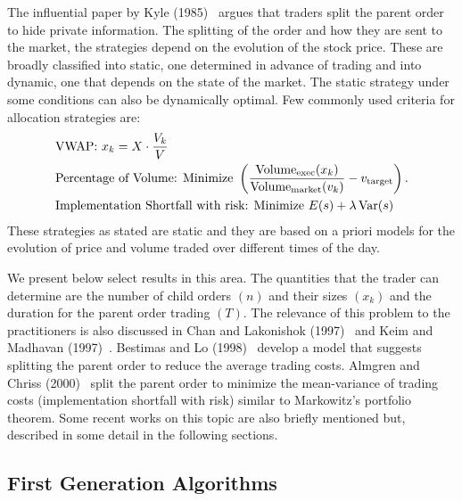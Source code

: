 The influential paper by Kyle (1985)~\cite{kyle1985} argues that traders split the parent order to hide private information. The splitting of the order and how they are sent to the market, the strategies depend on the evolution of the stock price. These are broadly classified into static, one determined in advance of trading and into dynamic, one that depends on the state of the market. The static strategy under some conditions can also be dynamically optimal. Few commonly used criteria for allocation strategies are:
	\[
	\begin{split}
	&\text{VWAP: } x_k= X \cdot \dfrac{V_k}{V} \\
	&\text{Percentage of Volume: Minimize } \left( \dfrac{\text{Volume}_{\text{exec}}(x_k)}{\text{Volume}_{\text{market}}(v_k)} - v_{\text{target}} \right). \\
	&\text{Implementation Shortfall with risk: Minimize } E(s) + \lambda \operatorname{Var}(s)
	\end{split}
	\]
These strategies as stated are static and they are based on a priori models for the evolution of price and volume traded over different times of the day. 


We present below select results in this area. The quantities that the trader can determine are the number of child orders $(n)$ and their sizes $(x_k)$ and the duration for the parent order trading $(T)$. The relevance of this problem to the practitioners is also discussed in Chan and Lakonishok (1997)~\cite{lakon} and Keim and Madhavan (1997)~\cite{madhavan}. Bestimas and Lo (1998)~\cite{berlo} develop a model that suggests splitting the parent order to reduce the average trading costs. Almgren and Chriss (2000)~\cite{alm2000} split the parent order to minimize the mean-variance of trading costs (implementation shortfall with risk) similar to Markowitz's portfolio theorem. Some recent works on this topic are also briefly mentioned but, described in some detail in the following sections.


\subsection{First Generation Algorithms \label{sec:first_gen}}

